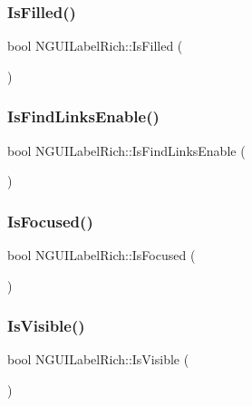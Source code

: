 \subsubsection{\texorpdfstring{Is\+Filled()}{IsFilled()}}
{\footnotesize\ttfamily bool N\+G\+U\+I\+Label\+Rich\+::\+Is\+Filled (\begin{DoxyParamCaption}{ }\end{DoxyParamCaption})}

\hypertarget{class_n_g_u_i_label_rich_ae3e5f9444f040557ed8fea8bc78e4257}{}\label{class_n_g_u_i_label_rich_ae3e5f9444f040557ed8fea8bc78e4257} 
\subsubsection{\texorpdfstring{Is\+Find\+Links\+Enable()}{IsFindLinksEnable()}}
{\footnotesize\ttfamily bool N\+G\+U\+I\+Label\+Rich\+::\+Is\+Find\+Links\+Enable (\begin{DoxyParamCaption}{ }\end{DoxyParamCaption})}

\hypertarget{class_n_g_u_i_label_rich_a6ab23d6e3fe0f874824c9520ec38c015}{}\label{class_n_g_u_i_label_rich_a6ab23d6e3fe0f874824c9520ec38c015} 
\subsubsection{\texorpdfstring{Is\+Focused()}{IsFocused()}}
{\footnotesize\ttfamily bool N\+G\+U\+I\+Label\+Rich\+::\+Is\+Focused (\begin{DoxyParamCaption}{ }\end{DoxyParamCaption})}

\hypertarget{class_n_g_u_i_label_rich_aebd37b3a18222b7c9d9d907de2a6f650}{}\label{class_n_g_u_i_label_rich_aebd37b3a18222b7c9d9d907de2a6f650} 
\subsubsection{\texorpdfstring{Is\+Visible()}{IsVisible()}}
{\footnotesize\ttfamily bool N\+G\+U\+I\+Label\+Rich\+::\+Is\+Visible (\begin{DoxyParamCaption}{ }\end{DoxyParamCaption})}


